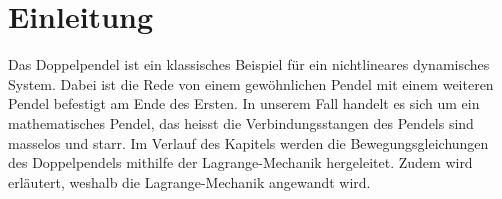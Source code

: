 
\section{Einleitung}
%
Das Doppelpendel ist ein klassisches Beispiel für ein nichtlineares dynamisches System.
%
Dabei ist die Rede von einem gewöhnlichen Pendel mit einem weiteren Pendel
befestigt am Ende des Ersten.
In unserem Fall handelt es sich um ein mathematisches Pendel, das heisst
die Verbindungsstangen des Pendels sind masselos und starr.
Im Verlauf des Kapitels werden die Bewegungsgleichungen des Doppelpendels
mithilfe der Lagrange-Mechanik hergeleitet.
Zudem wird erläutert, weshalb die Lagrange-Mechanik angewandt wird.
%

